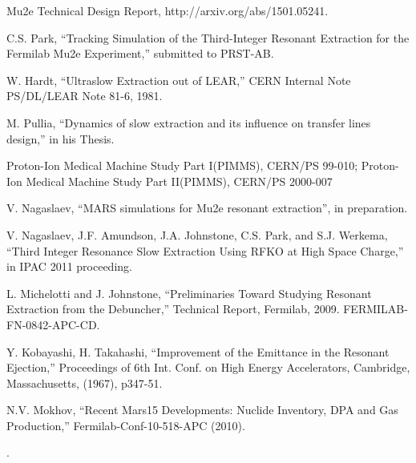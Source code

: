 \documentclass[aps,prstab,onecolumn,preprint,endfloats,11pt]{revtex4-1}
\begin{document}
\begin{thebibliography}{77}
  Mu2e Technical Design Report, http://arxiv.org/abs/1501.05241.

  C.S. Park, ``Tracking Simulation of the Third-Integer Resonant Extraction for the Fermilab Mu2e Experiment,'' submitted to PRST-AB.

  W. Hardt, ``Ultraslow Extraction out of LEAR,'' CERN Internal Note PS/DL/LEAR Note 81-6, 1981.

  M. Pullia, ``Dynamics of slow extraction and its influence on transfer lines design,'' in his Thesis.

  Proton-Ion Medical Machine Study Part I(PIMMS), CERN/PS 99-010; Proton-Ion Medical Machine Study Part II(PIMMS), CERN/PS 2000-007


  V. Nagaslaev, ``MARS simulations for Mu2e resonant extraction'', in preparation.

  V. Nagaslaev, J.F. Amundson, J.A. Johnstone, C.S. Park, and S.J. Werkema,  ``Third Integer Resonance Slow Extraction Using RFKO at High Space Charge,'' in  IPAC 2011 proceeding.

  L. Michelotti and J. Johnstone, ``Preliminaries Toward Studying Resonant Extraction from the Debuncher,'' Technical Report, Fermilab, 2009. FERMILAB-FN-0842-APC-CD.

  Y. Kobayashi, H. Takahashi, ``Improvement of the Emittance in the Resonant Ejection,'' Proceedings of 6th Int. Conf. on High Energy Accelerators, Cambridge, Massachusetts, (1967), p347-51.

  N.V. Mokhov, ``Recent Mars15 Developments: Nuclide Inventory, DPA and Gas Production,'' Fermilab-Conf-10-518-APC (2010).

.
\end{thebibliography}
\end{document}
